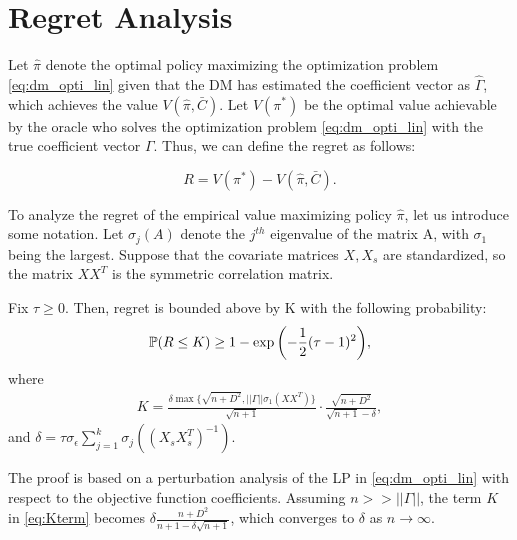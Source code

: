 \documentclass[11pt,a4paper]{article}
\begin{document}

\section{Regret Analysis}
Let $\hat \pi$ denote the optimal policy maximizing the optimization problem \eqref{eq:dm_opti_lin} given that the DM has estimated the coefficient vector as $\hat{\Gamma} $, which achieves the value $V(\hat \pi, \bar{C})$. Let $V(\pi^*)$ be the optimal value achievable by the oracle who solves the optimization problem \eqref{eq:dm_opti_lin} with the true coefficient vector $\Gamma$. Thus, we can define the regret as follows:

$$R = V(\pi^*) - V(\hat \pi, \bar{C}) .$$

To analyze the regret of the empirical value maximizing policy $\hat \pi$, let us introduce some notation. Let $\sigma_j( A)$ denote the $j^{th}$ eigenvalue of the matrix A, with $\sigma_1$ being the largest. Suppose that the covariate matrices $X, X_s$ are standardized, so the matrix $X X^T$ is the symmetric correlation matrix. 
\begin{thm}
Fix $\tau \geq 0$. Then, regret is bounded above by K with the following probability:
\begin{align}
\mathbb{P}(R \leq K) \geq 1 - \exp{\left( -\frac{1}{2} (\tau -1 )^2 \right)},
\end{align}
where
\begin{align}\label{eq:Kterm}
K =\frac{  \delta  \max \{\sqrt{n+D^2}, || \Gamma || \sigma_{1} (X X^T) \} }{ \sqrt{n+1} } \cdot \frac{ \sqrt{n+D^2} }{\sqrt{n+1} - \delta },
\end{align}
and $\delta = \tau \sigma_\epsilon \sum_{j=1}^k \sigma_j( (X_s X_s^T)^{-1})$.
\end{thm}

The proof is based on a perturbation analysis of the LP in \eqref{eq:dm_opti_lin} with respect to the objective function coefficients. Assuming $n >> ||\Gamma||$, the term $K$ in \eqref{eq:Kterm} becomes $\delta \frac{n+D^2}{n+1 -  \delta \sqrt{n+1}}$, which converges to $\delta$ as $n \rightarrow \infty$.
\end{document}
